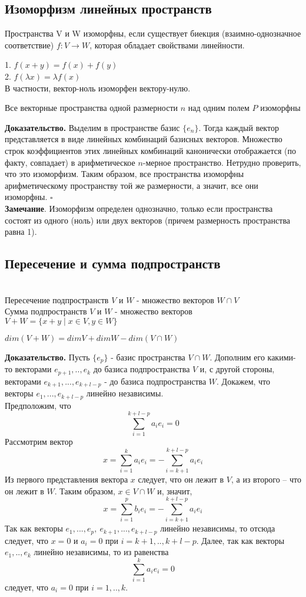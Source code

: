 \subsection{Изоморфизм линейных пространств}
\begin{defin}
Пространства V и W изоморфны, если существует биекция (взаимно-однозначное 
соответствие) $f\colon V\to W$, которая обладает свойствами линейности.
\end{defin}
1. $f(x+y)=f(x)+f(y)$\\
2. $f(\lambda x)=\lambda f(x)$\\
В частности, вектор-ноль изоморфен вектору-нулю. 
\begin{theor}
Все векторные пространства одной размерности $n$ над одним полем $P$ изоморфны
\end{theor}
\textbf{Доказательство.} Выделим в пространстве базис $\{e_n\}$. Тогда каждый
вектор представляется в виде линейных комбинаций базисных векторов. Множество 
строк коэффициентов этих линейных комбинаций канонически отображается (по 
факту, совпадает) в арифметическое $n$-мерное пространство. Нетрудно проверить,
что это изоморфизм. Таким образом, все пространства изоморфны арифметическому
пространству той же размерности, а значит, все они изоморфны. $\square$\\
\textbf{Замечание}. Изоморфизм определен однозначно, только если пространства
состоят из одного (ноль) или двух векторов (причем размерность пространства равна 1).


\subsection{Пересечение и сумма подпространств}
\begin{defin}\makebox{}\\
Пересечение подпространств $V$ и $W$ - множество векторов $W\cap V$\\
Сумма подпространств $V$ и $W$ - множество векторов
$V+W=\{x+y\mid x\in V,y\in W\}$
\end{defin}
\begin{theor}
$dim(V+W)=dimV+dimW-dim(V\cap W)$
\end{theor}
\textbf{Доказательство.} Пусть $\{e_p\}$ - базис пространства $V\cap W$.
Дополним его какими-то векторами $e_{p+1},..,e_k$ до базиса подпространства
$V$ и, с
другой стороны, векторами $e_{k+1},...,e_{k+l-p}$ - до базиса подпространства
$W$. Докажем, что векторы
$e_{1},...,e_{k+l-p}$ линейно независимы.\\
Предположим, что 
$$\sum\limits_{i=1}^{k+l-p}a_ie_i=0$$
Рассмотрим вектор
$$x=\sum\limits_{i=1}^{k}a_ie_i=-\sum\limits_{i=k+1}^{k+l-p}a_ie_i$$
Из первого представления вектора $x$ следует, что он лежит в $V$, а из второго
– что он лежит в $W$. Таким образом, $x\in V\cap W$ и, значит,
$$x=\sum\limits_{i=1}^{p}b_ie_i=-\sum\limits_{i=k+1}^{k+l-p}a_ie_i$$
Так как векторы $e_1,...,e_p,~e_{k+1},...,e_{k+l-p}$ линейно независимы, то
отсюда следует, что $x=0$ и $a_i =0$ при $i=k+1,..,k+l-p$. Далее,
так как векторы$e_1,.., e_k$ линейно независимы, то из равенства 
$$\sum\limits_{i=1}^{k}a_ie_i=0$$
следует, что $a_i=0$ при $i=1,.., k$.

